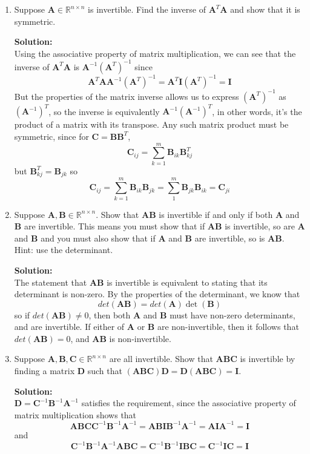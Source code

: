 \documentclass[]{article}
\newcommand{\R}{\mathbb{R}}				%
\newcommand{\A}{\bm{A}}					%
\newcommand{\I}{\bm{I}}					%
\newcommand{\solution}{\vskip 0.5cm \textbf{\large Solution:} \\}
\begin{document}
\begin{enumerate}
\begin{enumerate}
	  \end{enumerate}
	  
	\item Suppose $\A\in\R^{n\times n}$ is invertible. Find the inverse of $\A^T\A$ and show that it is symmetric.

	  \solution
	  Using the associative property of matrix multiplication, we can see that the inverse of $\A^T\A$ is $\A^{-1}(\A^T)^{-1}$ since
      \[
      \A^T \A \A^{-1}(\A^T)^{-1} = \A^T \I (\A^T)^{-1} = \I
      \]
      But the properties of the matrix inverse allows us to express
      $(\A^T)^{-1}$ as $(\A^{-1})^T$, so the inverse is equivalently
      $\A^{-1}(\A^{-1})^T$, in other words, it's the product of a matrix
      with its transpose. Any such matrix product must be symmetric,
      since for $\bm{C} = \bm{B}\bm{B}^T$,
      \[
      \bm{C}_{ij} = \sum_{k=1}^{m} \bm{B}_{ik} \bm{B}^T_{kj}
      \]
      but $\bm{B}^T_{kj} = \bm{B}_{jk}$ so
      \[
      \bm{C}_{ij} = \sum_{k=1}^{m} \bm{B}_{ik} \bm{B}_{jk} = \sum_{1}^{m} \bm{B}_{jk} \bm{B}_{ik} = \bm{C}_{ji}
      \]


	\item Suppose $\A,\bm{B}\in\R^{n\times n}$. Show that $\bm{AB}$ is invertible if and only if both $\A$ and $\bm{B}$ are invertible. This means you must show that if $\bm{AB}$ is invertible, so are $\A$ and $\bm{B}$ and you must also show that if $\A$ and $\bm{B}$ are invertible, so is $\bm{AB}$. Hint: use the determinant.

	  \solution

      The statement that $\A\bm{B}$ is invertible is equivalent to
      stating that its determinant is non-zero. By the properties of
      the determinant, we know that $$det(\A \bm{B}) = det(\A)
      \det(\bm{B})$$ so if $det(\A\bm{B}) \neq 0$, then both $\A$ and
      $\bm{B}$ must have non-zero determinants, and are invertible. If
      either of $\A$ or $\bm{B}$ are non-invertible, then it follows
      that $det(\A\bm{B}) = 0$, and $\A\bm{B}$ is non-invertible.

	\item Suppose $\A,\bm{B},\bm{C}\in\R^{n\times n}$ are all invertible. Show that $\bm{ABC}$ is invertible by finding a matrix $\bm{D}$ such that $(\bm{ABC})\bm{D}=\bm{D}(\bm{ABC})=\bm{I}$.

	  \solution

      $\bm{D} = \bm{C}^{-1} \bm{B}^{-1} \A^{-1}$ satisfies the
      requirement, since the associative property of matrix
      multiplication shows that
      $$ \bm{ABC}\bm{C}^{-1} \bm{B}^{-1} \A^{-1} = \bm{ABI} \bm{B}^{-1} \A^{-1} = \bm{AI} \A^{-1} = \I $$
      and
      $$ \bm{C}^{-1} \bm{B}^{-1} \A^{-1} \bm{ABC} = \bm{C}^{-1} \bm{B}^{-1} \bm{IBC} = \bm{C}^{-1} \bm{IC} = \I $$
      

\end{enumerate}
\end{document}
